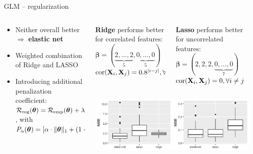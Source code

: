 \begin{frame2}{GLM -- regularization}


\begin{columns}[T, totalwidth=\textwidth]
  \begin{column}{0.62\textwidth}

  \begin{itemize}
    \item Neither overall better $\Rightarrow$ \textbf{elastic net}
    \item Weighted combination of Ridge and LASSO
    \item Introducing additional penalization coefficient: %
    $\mathcal{R}_{\text{reg}}(\bm{\theta}) = \mathcal{R}_{\text{emp}}(\bm{\theta}) 
    + \lambda \cdot P_{\alpha}(\bm{\theta})$, with\\
    $P_{\alpha}(\bm{\theta}) = [\alpha \cdot \|\bm{\theta}\|_1 + (1 - \alpha) \cdot \frac{1}{2} \cdot \|\bm{\theta}\|_2^2]$
  \end{itemize}  


\end{column}

\begin{column}{0.38\textwidth}
\tiny
\centering
\begin{columns}[T, totalwidth=\textwidth]
\begin{column}{0.5\textwidth}
\tiny
\begin{center}
\textbf{Ridge} performs better for correlated features: \\ 
\medskip
$\boldsymbol{\beta}=(\underbrace{2,\ldots,2}_{5},\underbrace{0,\ldots,0}_{5})$\\
$ \operatorname{cor}(\mathbf{X}_{i},\mathbf{X}_{j})=0.8^{|i-j|}, \forall i, j$
  \end{center}
\end{column}
\begin{column}{0.5\textwidth} \tiny

\begin{center}
\textbf{Lasso} performs better for uncorrelated features: \\
\medskip
$\boldsymbol{\beta}=(2, 2, 2,\underbrace{0,\ldots,0}_{7})$ \\
$\operatorname{cor}(\mathbf{X}_{i},\mathbf{X}_{j})= 0, \forall i \neq j$
\end{center}
\end{column}
\end{columns}
          \includegraphics[width=\textwidth]{figure/enet_lasso_ridge_mse.png}
          

\end{column}
\end{columns}
\end{frame2}
